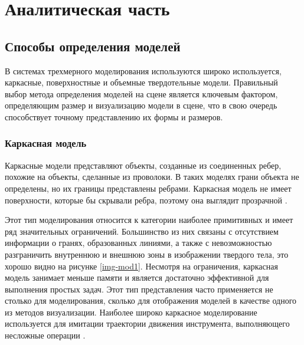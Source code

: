 \chapter{Аналитическая часть}


\section{Способы определения моделей}

В системах трехмерного моделирования используются широко используется, каркасные, поверхностные и объемные твердотельные модели. Правильный выбор метода определения моделей на сцене является ключевым фактором, определяющим размер и визуализацию модели в сцене, что в свою очередь способствует точному представлению их формы и размеров.

\subsection{Каркасная модель}
Каркасные модели представляют объекты, созданные из соединенных
ребер, похожие на объекты, сделанные из проволоки. В таких моделях грани объекта не определены, но их границы представлены ребрами. Каркасная модель не имеет поверхности, которые бы скрывали ребра, поэтому она выглядит прозрачной \cite{model_geom}.

Этот тип моделирования относится к категории наиболее примитивных и имеет ряд значительных ограничений. Большинство из них связаны с отсутствием информации о гранях, образованных линиями, а также с невозможностью разграничить внутреннюю и внешнюю зоны в изображении твердого тела, это хорошо видно на рисунке \ref{img-mod1}. Несмотря на ограничения, каркасная модель занимает меньше памяти и является достаточно эффективной для выполнения простых задач. Этот тип представления часто применяется не столько для моделирования, сколько для отображения моделей в качестве одного из методов визуализации. Наиболее широко каркасное моделирование используется для имитации траектории движения инструмента, выполняющего несложные операции \cite{model_geom_01}.

